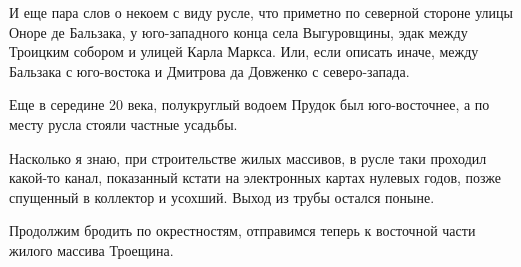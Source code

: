 И еще пара слов о некоем с виду русле, что приметно по северной стороне улицы Оноре де Бальзака, у юго-западного конца села Выгуровщины, эдак между Троицким собором и улицей Карла Маркса. Или, если описать иначе, между Бальзака с юго-востока и Дмитрова да Довженко с северо-запада.

Еще в середине 20 века, полукруглый водоем Прудок был юго-восточнее, а по месту русла стояли частные усадьбы.

Насколько я знаю, при строительстве жилых массивов, в русле таки проходил какой-то канал, показанный кстати на электронных картах нулевых годов, позже спущенный в коллектор и усохший. Выход из трубы остался поныне.

Продолжим бродить по окрестностям, отправимся теперь к восточной части жилого массива Троещина.
